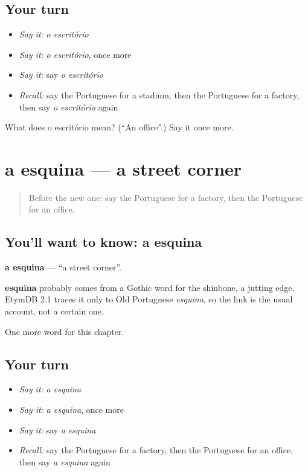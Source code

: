 \subsection*{Your turn}
\begin{itemize}
\raggedright
  \item \emph{Say it:} \emph{o escritório}
  \item \emph{Say it:} \emph{o escritório}, once more
  \item \emph{Say it:} say \emph{o escritório}
  \item \emph{Recall:} say the Portuguese for a stadium, then the Portuguese for a factory, then say \emph{o escritório} again
\end{itemize}

\begin{tcolorbox}[breakable,colback=teal!4,colframe=teal!35!black,title={Before you move on}]
What does o escritório mean? (\textquotedblleft{}An office\textquotedblright{}.) Say it once more.
\end{tcolorbox}
\section[a esquina]{a esquina — a street corner}

\label{lesson:PT-C87-esquina}



\begin{quote}
Before the new one: say the Portuguese for a factory, then the Portuguese for an office.
\end{quote}

\subsection*{You'll want to know: a esquina}
\textbf{a esquina} — \textquotedblleft{}a street corner\textquotedblright{}.

\begin{cousinweb}
\textbf{esquina} probably comes from a Gothic word for the shinbone, a jutting edge. EtymDB 2.1 traces it only to Old Portuguese \emph{esquina}, so the link is the usual account, not a certain one.
\end{cousinweb}

\begin{grammarlens}[title={What you've built}]
One more word for this chapter.
\end{grammarlens}

\subsection*{Your turn}
\begin{itemize}
\raggedright
  \item \emph{Say it:} \emph{a esquina}
  \item \emph{Say it:} \emph{a esquina}, once more
  \item \emph{Say it:} say \emph{a esquina}
  \item \emph{Recall:} say the Portuguese for a factory, then the Portuguese for an office, then say \emph{a esquina} again
\end{itemize}

